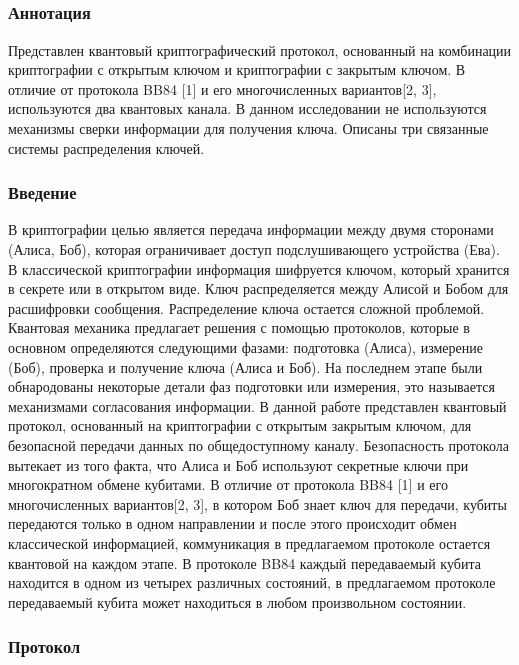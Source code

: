 \subsection{\trnas}


\subsubsection*{Аннотация}
Представлен квантовый криптографический протокол, основанный на комбинации криптографии с открытым ключом и криптографии с закрытым ключом. В отличие от протокола BB84 [1] и его многочисленных вариантов[2, 3], используются два квантовых канала. В данном исследовании не используются механизмы сверки информации для получения ключа. Описаны три связанные системы распределения ключей.

\subsubsection{Введение}
В криптографии целью является передача информации между двумя сторонами (Алиса, Боб), которая ограничивает доступ подслушивающего устройства (Ева). В классической криптографии информация шифруется ключом, который хранится в секрете или в открытом виде. Ключ распределяется между Алисой и Бобом для расшифровки сообщения. Распределение ключа остается сложной проблемой. Квантовая механика предлагает решения с помощью протоколов, которые в основном определяются следующими фазами: подготовка (Алиса), измерение (Боб), проверка и получение ключа (Алиса и Боб).
На последнем этапе были обнародованы некоторые детали фаз подготовки или измерения, это называется механизмами согласования информации.
В данной работе представлен квантовый протокол, основанный на криптографии с открытым закрытым ключом, для безопасной передачи данных по общедоступному каналу. Безопасность протокола вытекает из того факта, что Алиса и Боб используют секретные ключи при многократном обмене кубитами. В отличие от протокола BB84 [1] и его многочисленных вариантов[2, 3], в котором Боб знает ключ для передачи, кубиты передаются только в одном направлении и после этого происходит обмен классической информацией, коммуникация в предлагаемом протоколе остается квантовой на каждом этапе. В протоколе BB84 каждый передаваемый кубита находится в одном из четырех различных состояний, в предлагаемом протоколе передаваемый кубита может находиться в любом произвольном состоянии.

\subsubsection{Протокол}

